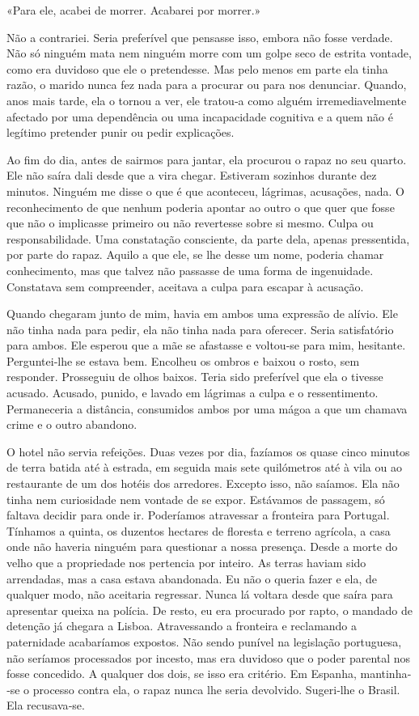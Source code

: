 «Para ele, acabei de morrer. Acabarei por morrer.»

Não a contrariei. Seria preferível que pensasse isso, embora não fosse
verdade. Não só ninguém mata nem ninguém morre com um golpe seco de
estrita vontade, como era duvidoso que ele o pretendesse. Mas pelo menos
em parte ela tinha razão, o marido nunca fez nada para a procurar ou
para nos denunciar. Quando, anos mais tarde, ela o tornou a ver, ele
tratou­‑a como alguém irremediavelmente afectado por uma dependência ou
uma incapacidade cognitiva e a quem não é legítimo pretender punir ou
pedir explicações.

Ao fim do dia, antes de sairmos para jantar, ela procurou o rapaz no seu
quarto. Ele não saíra dali desde que a vira chegar. Estiveram sozinhos
durante dez minutos. Ninguém me disse o que é que aconteceu, lágrimas,
acusações, nada. O reconhecimento de que nenhum poderia apontar ao outro
o que quer que fosse que não o implicasse primeiro ou não revertesse
sobre si mesmo. Culpa ou responsabilidade. Uma constatação consciente,
da parte dela, apenas pressentida, por parte do rapaz. Aquilo a que ele,
se lhe desse um nome, poderia chamar conhecimento, mas que talvez não
passasse de uma forma de ingenuidade. Constatava sem compreender,
aceitava a culpa para escapar à acusação.

Quando chegaram junto de mim, havia em ambos uma expressão de alívio.
Ele não tinha nada para pedir, ela não tinha nada para oferecer. Seria
satisfatório para ambos. Ele esperou que a mãe se afastasse e voltou­‑se
para mim, hesitante. Perguntei­‑lhe se estava bem. Encolheu os ombros e
baixou o rosto, sem responder. Prosseguiu de olhos baixos. Teria sido
preferível que ela o tivesse acusado. Acusado, punido, e lavado em
lágrimas a culpa e o ressentimento. Permaneceria a distância, consumidos
ambos por uma mágoa a que um chamava crime e o outro abandono.

O hotel não servia refeições. Duas vezes por dia, fazíamos os quase
cinco minutos de terra batida até à estrada, em seguida mais sete
quilómetros até à vila ou ao restaurante de um dos hotéis dos arredores.
Excepto isso, não saíamos. Ela não tinha nem curiosidade nem vontade de
se expor. Estávamos de passagem, só faltava decidir para onde ir.
Poderíamos atravessar a fronteira para Portugal. Tínhamos a quinta, os
duzentos hectares de floresta e terreno agrícola, a casa onde não
haveria ninguém para questionar a nossa presença. Desde a morte do velho
que a propriedade nos pertencia por inteiro. As terras haviam sido
arrendadas, mas a casa estava abandonada. Eu não o queria fazer e ela,
de qualquer modo, não aceitaria regressar. Nunca lá voltara desde que
saíra para apresentar queixa na polícia. De resto, eu era procurado por
rapto, o mandado de detenção já chegara a Lisboa. Atravessando a
fronteira e reclamando a paternidade acabaríamos expostos. Não sendo
punível na legislação portuguesa, não seríamos processados por incesto,
mas era duvidoso que o poder parental nos fosse concedido. A qualquer
dos dois, se isso era critério. Em Espanha, mantinha­‑se o processo
contra ela, o rapaz nunca lhe seria devolvido. Sugeri­‑lhe o Brasil. Ela
recusava­‑se.

